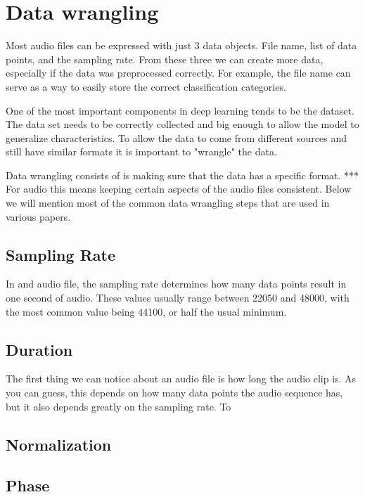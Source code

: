 \documentclass{book}
\begin{document}
\section{Data wrangling}
\qquad Most audio files can be expressed with just 3 data objects. File name, list of data points, and the sampling rate.
From these three we can create more data, especially if the data was preprocessed correctly.
For example, the file name can serve as a way to easily store the correct classification categories.
\par
One of the most important components in deep learning tends to be the dataset.
The data set needs to be correctly collected and big enough to allow the model to generalize characteristics.
To allow the data to come from different sources and still have similar formats it is important to "wrangle" the data.
\par
Data wrangling consists of is making sure that the data has a specific format. *** %
For audio this means keeping certain aspects of the audio files consistent.
Below we will mention most of the common data wrangling steps that are used in various papers.
\subsection{Sampling Rate}
In and audio file, the sampling rate determines how many data points result in one second of audio.
These values usually range between 22050 and 48000, with the most common value being 44100, or half the usual minimum.

\subsection{Duration}
The first thing we can notice about an audio file is how long the audio clip is.
As you can guess, this depends on how many data points the audio sequence has, but it also depends greatly on the sampling rate.
To 
\subsection{Normalization}
\subsection{Phase}
\end{document}
